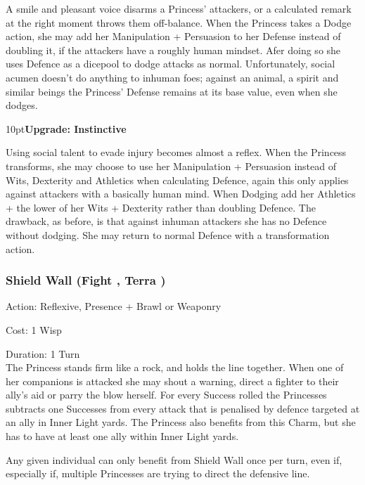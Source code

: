\noindent A smile and pleasant voice disarms a Princess' attackers, or a calculated remark at the right moment throws them off-balance. When the Princess takes a Dodge action, she may add her Manipulation + Persuasion to her Defense instead of doubling it, if the attackers have a roughly human mindset. Afer doing so she uses Defence as a dicepool to dodge attacks as normal. Unfortunately, social acumen doesn't do anything to inhuman foes; against an animal, a spirit and similar beings the Princess' Defense remains at its base value, even when she dodges.

\begin{myindentpar}{10pt}\textbf{Upgrade: Instinctive}

Using social talent to evade injury becomes almost a reflex. When the Princess transforms, she may choose to use her Manipulation + Persuasion instead of Wits, Dexterity and Athletics when calculating Defence, again this only applies against attackers with a basically human mind. When Dodging add her Athletics + the lower of her Wits + Dexterity rather than doubling Defence. The drawback, as before, is that against inhuman attackers she has no Defence without dodging. She may return to normal Defence with a transformation action.\end{myindentpar}

\subsubsection*{Shield Wall (Fight \textbullet, Terra \textbullet\textbullet)}

\noindent Action: Reflexive, Presence + Brawl or Weaponry 

\noindent Cost: 1 Wisp

\noindent Duration: 1 Turn\\

\noindent The Princess stands firm like a rock, and holds the line together. When one of her companions is attacked she may shout a warning, direct a fighter to their ally's aid or parry the blow herself. For every Success rolled the Princesses subtracts one Successes from every attack that is penalised by defence targeted at an ally in Inner Light yards. The Princess also benefits from this Charm, but she has to have at least one ally within Inner Light yards.

Any given individual can only benefit from Shield Wall once per turn, even if, especially if, multiple Princesses are trying to direct the defensive line.

